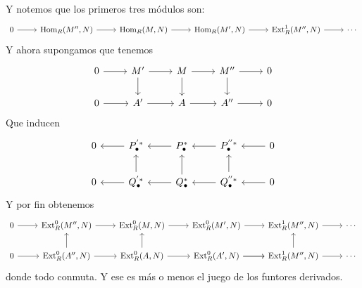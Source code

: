 \documentclass[spanish]{book}
\theoremstyle{definition}
\DeclareMathOperator{\Hom}{Hom}
\DeclareMathOperator{\Ext}{Ext}
\begin{document}
Y notemos que los primeros tres módulos son:
\[\begin{tikzcd}
	0\arrow[r]&\Hom_R(M'',N)\arrow[r]&\Hom_R(M,N)\arrow[r]&\Hom_R(M',N)\arrow[r]&\Ext_R^1(M'',N)\arrow[r]&\cdots
\end{tikzcd}\]
Y ahora supongamos que tenemos
\[\begin{tikzcd}
	0\arrow[r]&M'\arrow[r]\arrow[d]&M\arrow[r]\arrow[d]&M''\arrow[r]\arrow[d]&0\\
		0\arrow[r]&A'\arrow[r]&A\arrow[r]&A''\arrow[r]&0
\end{tikzcd}\]
Que inducen
\[\begin{tikzcd}
	0&P^{'*}_\bullet\arrow[l]&P^*_\bullet\arrow[l]&P_\bullet^{''*}\arrow[l]&0\arrow[l]\\
		0&Q^{'*}_\bullet\arrow[l]\arrow[u]&Q^{*}_\bullet\arrow[l]\arrow[u]&Q_\bullet^{''*}\arrow[l]\arrow[u]&0\arrow[l]
\end{tikzcd}\]
Y por fin obtenemos
\[\begin{tikzcd}
	0\arrow[r]&\Ext_R^0(M'',N)\arrow[r]&\Ext_R^0(M,N)\arrow[r]&\Ext_R^0(M',N)\arrow[r]&\Ext_R^1(M'',N)\arrow[r]&\cdots\\
		0\arrow[r]&\Ext_R^0(A'',N)\arrow[r]\arrow[u]&\Ext_R^0(A,N)\arrow[r]\arrow[u]&\Ext_R^0(A',N)\arrow[r]\arrow[r]&\Ext_R^1(M'',N)\arrow[r]\arrow[u]&\cdots
\end{tikzcd}\]
donde todo conmuta. Y ese es más o menos el juego de los funtores derivados.
\end{document}
